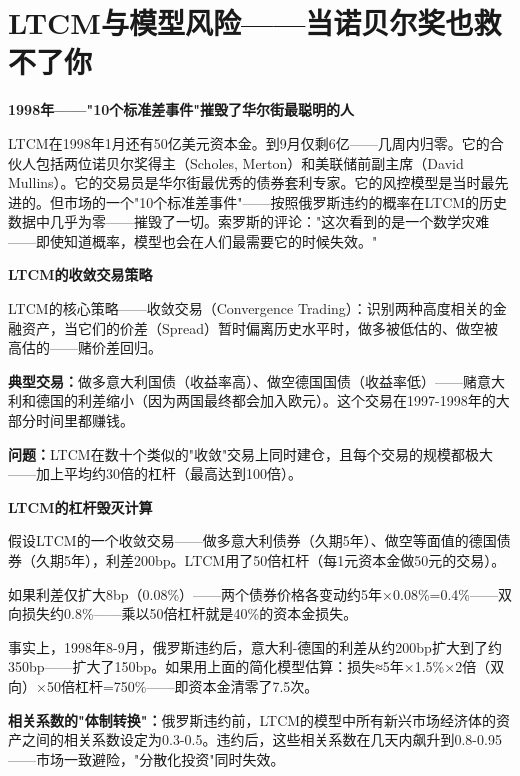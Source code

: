 \documentclass[a4paper,11pt]{ctexbook}
\begin{document}
\chapter{LTCM与模型风险——当诺贝尔奖也救不了你}

\begin{scenario}
\textbf{1998年——"10个标准差事件"摧毁了华尔街最聪明的人}

LTCM在1998年1月还有50亿美元资本金。到9月仅剩6亿——几周内归零。它的合伙人包括两位诺贝尔奖得主（Scholes, Merton）和美联储前副主席（David Mullins）。它的交易员是华尔街最优秀的债券套利专家。它的风控模型是当时最先进的。但市场的一个"10个标准差事件"——按照俄罗斯违约的概率在LTCM的历史数据中几乎为零——摧毁了一切。索罗斯的评论："这次看到的是一个数学灾难——即使知道概率，模型也会在人们最需要它的时候失效。"
\end{scenario}

\begin{qualitative}
\textbf{LTCM的收敛交易策略}

LTCM的核心策略——收敛交易（Convergence Trading）：识别两种高度相关的金融资产，当它们的价差（Spread）暂时偏离历史水平时，做多被低估的、做空被高估的——赌价差回归。

\textbf{典型交易：}做多意大利国债（收益率高）、做空德国国债（收益率低）——赌意大利和德国的利差缩小（因为两国最终都会加入欧元）。这个交易在1997-1998年的大部分时间里都赚钱。

\textbf{问题：}LTCM在数十个类似的"收敛"交易上同时建仓，且每个交易的规模都极大——加上平均约30倍的杠杆（最高达到100倍）。
\end{qualitative}

\begin{quantitative}
\textbf{LTCM的杠杆毁灭计算}

假设LTCM的一个收敛交易——做多意大利债券（久期5年）、做空等面值的德国债券（久期5年），利差200bp。LTCM用了50倍杠杆（每1元资本金做50元的交易）。

如果利差仅扩大8bp（0.08\%）——两个债券价格各变动约5年×0.08\%=0.4\%——双向损失约0.8\%——乘以50倍杠杆就是40\%的资本金损失。

事实上，1998年8-9月，俄罗斯违约后，意大利-德国的利差从约200bp扩大到了约350bp——扩大了150bp。如果用上面的简化模型估算：损失≈5年×1.5\%×2倍（双向）×50倍杠杆=750\%——即资本金清零了7.5次。

\textbf{相关系数的"体制转换"：}俄罗斯违约前，LTCM的模型中所有新兴市场经济体的资产之间的相关系数设定为0.3-0.5。违约后，这些相关系数在几天内飙升到0.8-0.95——市场一致避险，"分散化投资"同时失效。
\end{quantitative}
\end{document}
